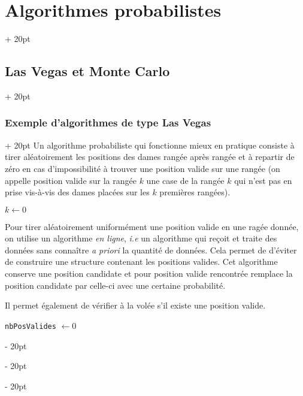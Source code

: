 \documentclass[a4paper, 12pt, twoside]{article}
\newenvironment{indalgo}[2][H]{
    \begin{algoBox}
        \begin{algorithm}[#1]
            \caption{#2}
}
{
        \end{algorithm}
    \end{algoBox}
}
\newcommand{\ind}[1][20pt]{\advance\leftskip + #1}
\newcommand{\deind}[1][20pt]{\advance\leftskip - #1}
\newenvironment{indt}[2][20pt]{#2 \par \ind[#1]}{\par \deind} %
\newcommand{\1}{\mathbbm 1}
\begin{document}
\begin{indt}{\section{Algorithmes probabilistes}}
\begin{indt}{\subsection{Las Vegas et Monte Carlo}}
\begin{indt}{\subsubsection{Exemple d'algorithmes de type Las Vegas}}
                Un algorithme probabiliste qui fonctionne mieux en pratique consiste à tirer aléatoirement les positions des dames rangée après rangée et à repartir de zéro en cas d'impossibilité à trouver une position valide sur une rangée (on appelle position valide sur la rangée $k$ une case de la rangée $k$ qui n'est pas en prise vis-à-vis des dames placées sur les $k$ premières rangées).

                \begin{indalgo}{Solution probabiliste au problème des $N$ reines}
                    \label{alg:6}

                    $k \gets 0$\;

                \end{indalgo}

                Pour tirer aléatoirement uniformément une position valide en une ragée donnée, on utilise un algorithme \emph{en ligne}, \textit{i.e} un algorithme qui reçoit et traite des données sans connaître \textit{a priori} la quantité de données.
                Cela permet de d'éviter de construire une structure contenant les positions valides.
                Cet algorithme conserve une position candidate et pour position valide rencontrée remplace la position candidate par celle-ci avec une certaine probabilité.

                Il permet également de vérifier à la volée s'il existe une position valide.

                \begin{indalgo}{Tirage aléatoire uniforme de la position}
                    \label{alg:7}

                    \texttt{nbPosValides} $\gets 0$\;

\end{indalgo}
\end{indt}
\end{indt}
\end{indt}
\end{document}
